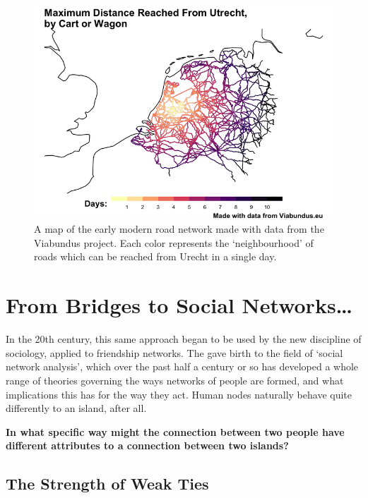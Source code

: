 \documentclass[
]{book}
\begin{document}
\begin{figure}
\centering
\includegraphics[width=5.20833in,height=\textheight]{images/viabundus.png}
\caption{A map of the early modern road network made with data from the Viabundus project. Each color represents the `neighbourhood' of roads which can be reached from Urecht in a single day.}
\end{figure}

\hypertarget{from-bridges-to-social-networks}{%
\section{From Bridges to Social Networks\ldots{}}\label{from-bridges-to-social-networks}}

In the 20th century, this same approach began to be used by the new discipline of sociology, applied to friendship networks. The gave birth to the field of `social network analysis', which over the past half a century or so has developed a whole range of theories governing the ways networks of people are formed, and what implications this has for the way they act. Human nodes naturally behave quite differently to an island, after all.

\textbf{In what specific way might the connection between two people have different attributes to a connection between two islands?}

\hypertarget{the-strength-of-weak-ties}{%
\subsection{The Strength of Weak Ties}\label{the-strength-of-weak-ties}}
\end{document}
